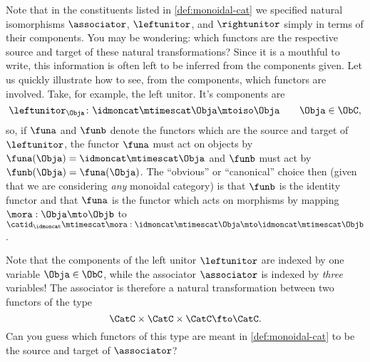 \begin{remark}
    Note that in the constituents listed in \cref{def:monoidal-cat} we specified natural isomorphisms $\associator$, $\leftunitor$, and $\rightunitor$ simply in terms of their components.
You may be wondering: which functors are the respective source and target of these natural transformations? Since it is a mouthful to write, this information is often left to be inferred from the components given.
Let us quickly illustrate how to see, from the components, which functors are involved.
Take, for example, the left unitor.
It's components are
    \begin{equation*}
        \leftunitor_\Obja \colon \idmoncat\mtimescat \Obja \mtoiso \Obja \quad \quad \Obja\in \ObC,
    \end{equation*}
    so, if $\funa$ and $\funb$ denote the functors which are the source and target of $\leftunitor$, the functor $\funa$ must act on objects by $\funa(\Obja) = \idmoncat \mtimescat \Obja$ and $\funb$ must act by $\funb(\Obja) = \funa(\Obja)$.
The ``obvious'' or ``canonical'' choice then (given that we are considering \emph{any} monoidal category) is that $\funb$ is the identity functor and that $\funa$ is the functor which acts on morphisms by mapping $\mora : \Obja \mto \Objb$ to $\catid_\idmoncat \mtimescat \mora:   \idmoncat\mtimescat \Obja \mto  \idmoncat\mtimescat \Objb$.
    
    Note that the components of the left unitor $\leftunitor$ are indexed by one variable $\Obja \in \ObC$, while the associator $\associator$ is indexed by \emph{three} variables! The associator is therefore a natural transformation between two functors of the type
    $$
    \CatC \times \CatC \times \CatC \fto \CatC.
    $$
    Can you guess which functors of this type are meant in \cref{def:monoidal-cat} to be the source and target of $\associator$?
\end{remark}



